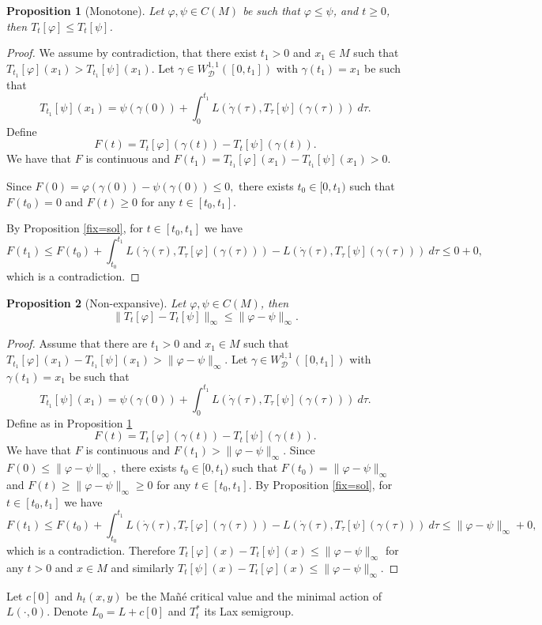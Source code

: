 \documentclass[12pt]{amsart}
\theoremstyle{plain}
\newtheorem{proposition}{Proposition}
\theoremstyle{definition}
\newcommand{\cD}{\mathcal D}
\newcommand{\cW}{W^{1,1}}
\newcommand{\cWD}{\cW_\cD}
\newcommand{\fui}{\varphi}
\newcommand{\ga}{\gamma}
\newcommand{\dga}{\dot\gamma}
\begin{document}
\begin{proposition}[Monotone]\label{monotony}
 Let $\fui, \psi\in C(M)$ be such that $\fui\le\psi$, and $t\geq 0$, then
 $T_t[\fui]\le T_t[\psi]$. 
\end{proposition}
\begin{proof}
We  assume by contradiction, that there exist
$t_1>0$ and $x_1\in M$ such that $T_{t_1}[\fui](x_1) > T_{t_1}[\psi](x_1)$.
Let $\ga\in\cWD([0,t_1])$ with $\ga(t_1)=x_1$ be such that
\[T_{t_1} [\psi](x_1)=\psi(\ga(0))+\int_0^{t_1}L(\dga(\tau),T_\tau
[\psi](\ga(\tau)))\ d\tau. \]
Define
\[F(t)=T_{t}[\fui](\ga(t)) - T_{t}  [\psi](\ga(t)).\]
We have that $F$ is continuous and $F(t_1)=T_{t_1}[\fui](x_1)- T_{t_1}[\psi](x_1)>0$. 

Since $F(0)=\fui(\ga(0)) - \psi(\ga(0))\le 0,$ there exists
$t_0\in [0,t_1)$ such that $F(t_0)=0$ and $F(t)\ge 0$ for any $t\in[t_0,t_1]$.

By  Proposition \ref{fix=sol}, for $t\in [t_0,t_1]$ we have
\[F(t_1)\le
 F(t_0)   +\int_{t_0}^{t_1} L(\dga(\tau),T_\tau
[\fui](\ga(\tau))) -L(\dga(\tau),T_\tau [\psi](\ga(\tau)))\ d\tau
\leq 0+0,\]
which is a contradiction.
\end{proof}
\begin{proposition}[Non-expansive]\label{non-exp}
  Let $\fui,\psi\in C(M)$, then
  \[\|T_t[\fui]-T_t[\psi]\|_\infty\leq \|\fui-\psi\|_\infty.\]
\end{proposition}
\begin{proof}
  Assume that there are
  $t_1>0$ and $x_1\in M$ such that
  $T_{t_1}[\fui](x_1)- T_{t_1}[\psi](x_1) >\|\fui-\psi\|_\infty$.
Let $\ga\in\cWD([0,t_1])$ with $\ga(t_1)=x_1$ be such that
\[T_{t_1} [\psi](x_1)=\psi(\ga(0))+\int_0^{t_1}L(\dga(\tau),T_\tau
[\psi](\ga(\tau)))\ d\tau. \]
Define as in Proposition \ref{monotony}
\[F(t)=T_{t}[\fui](\ga(t)) - T_{t}  [\psi](\ga(t)).\]
We have that $F$ is continuous and $F(t_1) >\|\fui-\psi\|_\infty$. 
Since $F(0)\le \|\fui-\psi\|_\infty,$ there exists
$t_0\in [0,t_1)$ such that $F(t_0)=\|\fui-\psi\|_\infty$ and
$F(t)\ge \|\fui-\psi\|_\infty\ge 0$ for any $t\in[t_0,t_1]$.
By  Proposition \ref{fix=sol}, for $t\in [t_0,t_1]$ we have
\[F(t_1)\le
    F(t_0)+\int_{t_0}^{t_1} L(\dga(\tau),T_\tau
[\fui](\ga(\tau))) -L(\dga(\tau),T_\tau [\psi](\ga(\tau)))\ d\tau
\leq\|\fui-\psi\|_\infty+0,\]
which is a contradiction. Therefore
$T_t[\fui](x)- T_t[\psi](x) \le\|\fui-\psi\|_\infty$ for any $t>0$ and
$x\in M$ and similarly $T_t[\psi](x)- T_t[\fui](x) \le\|\fui-\psi\|_\infty$.
\end{proof}
 Let $c[0]$ and  $h_t(x,y)$ be the Ma\~n\'e critical value and the
 minimal action of $L(\cdot,0)$. Denote $L_0=L+c[0]$ and 
 $T_t^*$ its Lax semigroup.
\end{document}
